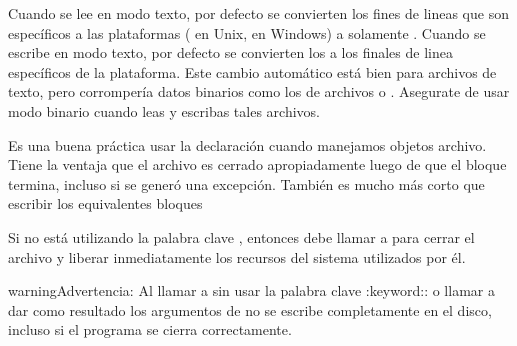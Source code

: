 \documentclass[a4,10pt,spanish]{sphinxmanual}
\begin{document}
\sphinxAtStartPar
Cuando se lee en modo texto, por defecto se convierten los fines de lineas que son específicos a las plataformas ( en Unix,  en Windows) a solamente .  Cuando se escribe en modo texto, por defecto se convierten los  a los finales de linea específicos de la plataforma. Este cambio automático está bien para archivos de texto, pero corrompería datos binarios como los de archivos  o .  Asegurate de usar modo binario cuando leas y escribas tales archivos.

\sphinxAtStartPar
Es una buena práctica usar la declaración  cuando manejamos objetos archivo.  Tiene la ventaja que el archivo es cerrado apropiadamente luego de que el bloque termina, incluso si se generó una excepción.  También es mucho más corto que escribir los equivalentes bloques \sphinxhyphen{}

\begin{sphinxVerbatim}[commandchars=\\\{\}]
   
      

\end{sphinxVerbatim}

\sphinxAtStartPar
Si no está utilizando la palabra clave , entonces debe llamar a  para cerrar el archivo y liberar inmediatamente los recursos del sistema utilizados por él.

\begin{sphinxadmonition}{warning}{Advertencia:}
\sphinxAtStartPar
Al llamar a  sin usar la palabra clave :keyword:: o llamar a   dar como resultado los argumentos de  no se escribe completamente en el disco, incluso si el programa se cierra correctamente.
\end{sphinxadmonition}
\end{document}

